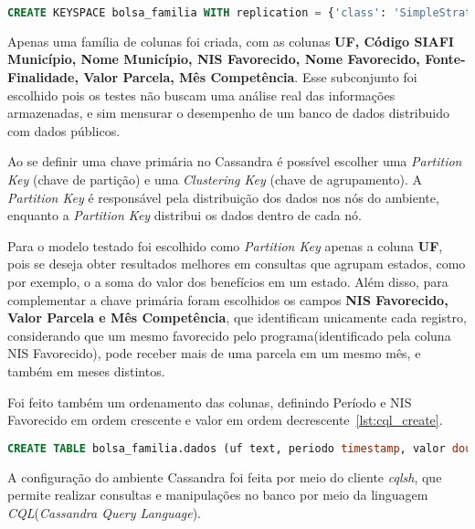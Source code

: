 \noindent
\begin{minipage}[c]{1\textwidth}
\begin{lstlisting}[caption={Código CQL criação do keyspace},label={lst:cql_create_keyspace},language=SQL]
CREATE KEYSPACE bolsa_familia WITH replication = {'class': 'SimpleStrategy', 'replication_factor': 1};
\end{lstlisting}
\end{minipage}

Apenas uma família de colunas foi criada, com as colunas \textbf{UF, Código SIAFI Município, Nome Município, NIS Favorecido, Nome Favorecido, Fonte-Finalidade, Valor Parcela, Mês Competência}. Esse subconjunto foi escolhido pois os testes não buscam uma análise real das informações armazenadas, e sim mensurar o desempenho de um banco de dados distribuido com dados públicos.

Ao se definir uma chave primária no Cassandra é possível escolher uma \emph{Partition Key} (chave de partição) e uma \emph{Clustering Key} (chave de agrupamento). A \emph{Partition Key} é responsável pela distribuição dos dados nos nós do ambiente, enquanto a \emph{Partition Key} distribui os dados dentro de cada nó.

Para o modelo testado foi escolhido como \emph{Partition Key} apenas a coluna \textbf{UF}, pois se deseja obter resultados melhores em consultas que agrupam estados, como por exemplo, o a soma do valor dos benefícios em um estado. Além disso, para complementar a chave primária foram escolhidos os campos \textbf{NIS Favorecido, Valor Parcela e Mês Competência}, que identificam unicamente cada registro, considerando que um mesmo favorecido pelo programa(identificado pela coluna NIS Favorecido), pode receber mais de uma parcela em um mesmo mês, e também em meses distintos.

Foi feito também um ordenamento das colunas, definindo Período e NIS Favorecido em ordem crescente e valor em ordem decrescente~\ref{lst:cql_create}. 

\begin{lstlisting}[caption={Código CQL criação da tabela},label={lst:cql_create},language=SQL]
CREATE TABLE bolsa_familia.dados (uf text, periodo timestamp, valor double, nis_favorecido bigint, cod_municipio int, fonte text, nome_favorecido text, nome_municipio text, PRIMARY KEY(uf, periodo, valor, nis_favorecido)) WITH CLUSTERING ORDER BY(periodo ASC, valor DESC, nis_favorecido ASC);
\end{lstlisting}

A configuração do ambiente Cassandra foi feita por meio do cliente \emph{cqlsh}, que permite realizar consultas e manipulações no banco por meio da linguagem \emph{CQL}(\emph{Cassandra Query Language}).

